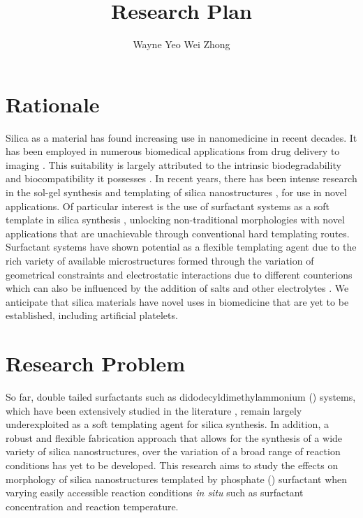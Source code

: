 \documentclass[a4paper,12pt]{article}
\date{}
\author{Wayne Yeo Wei Zhong} %
\title{Research Plan} %
\begin{document}
	\maketitle
	
	\section*{Rationale}
	Silica as a material has found increasing use in nanomedicine in recent decades. It has been employed in numerous biomedical applications from drug delivery \cite{slowing2008} to imaging \cite{ow2005}. This suitability is largely attributed to the intrinsic biodegradability and biocompatibility it possesses \cite{popplewell1998}. In recent years, there has been intense research in the sol-gel synthesis \cite{stober1968,yang2008,pohaku2012} and templating of silica nanostructures \cite{kresge1992,tomczak2005,bellomo2006,liu2013}, for use in novel applications. Of particular interest is the use of surfactant systems as a soft template in silica synthesis \cite{kresge1992,colfen2007} , unlocking non-traditional morphologies with novel applications that are unachievable through conventional hard templating routes. Surfactant systems have shown potential as a flexible templating agent due to the rich variety of available microstructures formed through the variation of geometrical constraints \cite{israelachvili1976} and electrostatic interactions due to different counterions \cite{kang1993} which can also be influenced by the addition of salts and other electrolytes \cite{thalberg1991}. We anticipate that silica materials have novel uses in biomedicine that are yet to be established, including artificial platelets.
	
	\section*{Research Problem}
	So far, double tailed surfactants such as didodecyldimethylammonium () systems, which have been extensively studied in the literature \cite{warr1988,liu2014}, remain largely underexploited as a soft templating agent for silica synthesis. In addition, a robust and flexible fabrication approach that allows for the synthesis of a wide variety of silica nanostructures, over the variation of a broad range of reaction conditions has yet to be developed. This research aims to study the effects on morphology of silica nanostructures templated by  phosphate () surfactant when varying easily accessible reaction conditions \textit{in situ} such as surfactant concentration and reaction temperature.	 
	
\end{document}
